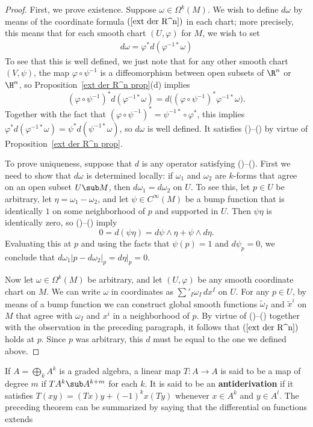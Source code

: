 \begin{proof}
First, we prove existence. Suppose $\omega\in\Omega^k(M)$. We wish to define $d\omega$ by
means of the coordinate formula $(\ref{ext der R^n})$ in each chart; more precisely, this means that for each smooth chart $(U,\varphi)$ for $M$, we wish to set
\begin{align}\label{ext der def}
d\omega=\varphi^*d(\varphi^{-1*}\omega)
\end{align}
To see that this is well defined, we just note that for any other smooth chart $(V,\psi)$, the map $\varphi\circ\psi^{-1}$ is a diffeomorphism between open subsets of $\R^n$ or $\H^n$, so Proposition~\ref{ext der R^n prop}(d) implies
\[(\varphi\circ\psi^{-1})^*d(\varphi^{-1*}\omega)=d\big((\varphi\circ\psi^{-1})^*\varphi^{-1*}\omega\big).\]
Together with the fact that $(\varphi\circ\psi^{-1})^*=\psi^{-1*}\circ\varphi^*$, this implies $\varphi^*d(\varphi^{-1*}\omega)=\psi^*d(\psi^{-1*}\omega)$, so $d\omega$ is well defined. It satisfies ()--() by virtue of Proposition~\ref{ext der R^n prop}.\par
To prove uniqueness, suppose that $d$ is any operator satisfying ()--(). First we need to show that $d\omega$ is determined locally: if $\omega_1$ and $\omega_2$ are $k$-forms that agree on an open subset $U\sub M$, then $d\omega_1=d\omega_2$ on $U$. To see this, let $p\in U$ be arbitrary, let $\eta=\omega_1-\omega_2$, and let $\psi\in C^\infty(M)$ be a bump function that is identically $1$ on some neighborhood of $p$ and supported in $U$. Then $\psi\eta$ is identically zero, so ()--() imply 
\[0=d(\psi\eta)=d\psi\wedge\eta+\psi\wedge d\eta.\]
Evaluating this at $p$ and using the facts that $\psi(p)=1$ and $d\psi_p=0$, we conclude that $d\omega_1|p-d\omega_2|_p=d\eta|_p=0$.\par
Now let $\omega\in\Omega^k(M)$ be arbitrary, and let $(U,\varphi)$ be any smooth coordinate chart on $M$. We can write $\omega$ in coordinates as $\sum'_I\omega_I\,dx^I$ on $U$. For any $p\in U$, by means of a bump function we can construct global smooth functions $\widetilde{\omega}_I$ and $\widetilde{x}^i$ on $M$ that agree with $\omega_I$ and $x^i$ in a neighborhood of $p$. By virtue of ()--() together with the observation in the preceding paragraph, it follows that $(\ref{ext der R^n})$ holds at $p$. Since $p$ was arbitrary, this $d$ must be equal to the one we defined above.
\end{proof}
If $A=\bigoplus_{k}A^k$ is a graded algebra, a linear map $T:A\to A$ is said to be a map of degree $m$ if $TA^k\sub A^{k+m}$ for each $k$. It is said to be an \textbf{antiderivation} if it satisfies $T(xy)=(Tx)y+(-1)^kx(Ty)$ whenever $x\in A^k$ and $y\in A^l$. The preceding theorem can be summarized by saying that the differential on functions extends
